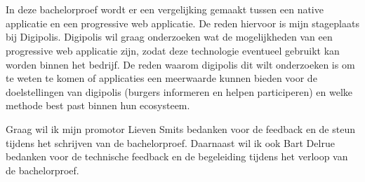 
\chapter*{}
\label{ch:voorwoord}

In deze bachelorproef wordt er een vergelijking gemaakt tussen een native applicatie en een progressive web applicatie. De reden hiervoor is mijn stageplaats bij Digipolis. Digipolis wil graag onderzoeken wat de mogelijkheden van een progressive web applicatie zijn, zodat deze technologie eventueel gebruikt kan worden binnen het bedrijf. De reden waarom digipolis dit wilt onderzoeken is om te weten te komen of applicaties een meerwaarde kunnen bieden voor de doelstellingen van digipolis (burgers informeren en helpen participeren) en welke methode best past binnen hun ecosysteem.

Graag wil ik mijn promotor Lieven Smits bedanken voor de feedback en de steun tijdens het schrijven van de bachelorproef. Daarnaast wil ik ook Bart Delrue bedanken voor de technische feedback en de begeleiding tijdens het verloop van de bachelorproef.



